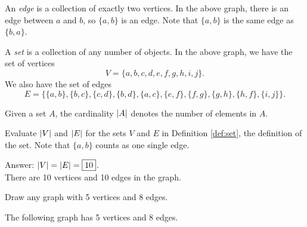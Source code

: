 \documentclass[11pt]{article}
\begin{document}
\begin{definition}
\label{def:edge}
An \textit{edge} is a collection of exactly two vertices. In the above graph, there is an edge
between $a$ and $b$, so $\{a, b\}$ is an edge. Note that $\{a,b\}$ is the same edge as $\{b,a\}$.
\end{definition}

\begin{definition}
\label{def:set}
A \textit{set} is a collection of any number of objects. In the above graph, we have the set of vertices
\[V=\{a, b, c, d, e, f, g, h, i, j\}.\]
We also have the set of edges
\[E=\{\{a,b\}, \{b,c\}, \{c,d\},\{b,d\},\{a,c\},\{e,f\},\{f,g\},\{g,h\},\{h,f\},\{i,j\} \}.\]
\end{definition}

\begin{definition}
\label{def:cardinality}
Given a set $A$, the cardinality $\left\lvert A \right\rvert$ denotes the number of elements in $A$.
\end{definition}

\begin{problem}[1 point] %
Evaluate $\left\lvert V \right\rvert$ and $\left\lvert E \right\rvert$ for the sets $V$ and $E$ in Definition \ref{def:set}, the definition of the set.
Note that $\{a,b\}$ counts as one single edge.
\end{problem}

\begin{solution}
Answer: $\left\lvert V \right\rvert = \left\lvert E \right\rvert = \boxed{10}$. \\
There are 10 vertices and 10 edges in the graph.
\end{solution}

\begin{problem}[1 point] %
Draw any graph with 5 vertices and 8 edges.
\end{problem}

\begin{solution}
The following graph has 5 vertices and 8 edges.
\begin{center}
\end{center}
\end{solution}
\end{document}
